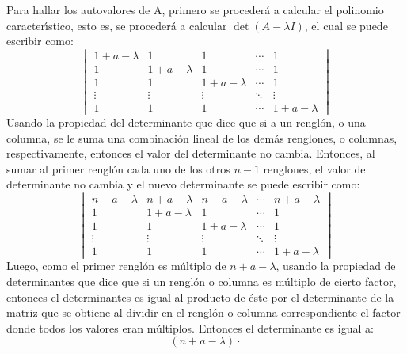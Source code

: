 \begin{solucion}
 Para hallar los autovalores de A, primero se proceder\'a a calcular el polinomio caracter\'{\i}stico, esto es, se proceder\'a a calcular $\det (A - \lambda I)$, el cual se puede escribir como:
 \begin{equation*}
  \begin{vmatrix}
   1+a-\lambda & 1               &    1           & \cdots & 1 \\ 
   1           & 1 + a - \lambda &    1           & \cdots & 1 \\
   1           & 1               & 1 + a - \lambda & \cdots & 1 \\
   \vdots & \vdots & \vdots & \ddots & \vdots \\
   1           & 1               &    1           & \cdots & 1 + a - \lambda 
  \end{vmatrix}
 \end{equation*}
 Usando la propiedad del determinante que dice que si a un rengl\'on, o una columna, se le suma una combinaci\'on lineal de los dem\'as renglones, o columnas, respectivamente, entonces el valor del determinante no cambia. Entonces, al sumar al primer rengl\'on cada uno de los otros $n-1$ renglones, el valor del determinante no cambia y el nuevo determinante se puede escribir como:
 \begin{equation*}
  \begin{vmatrix}
   n + a - \lambda & n + a - \lambda & n + a - \lambda & \cdots & n + a - \lambda \\ 
   1               & 1 + a - \lambda & 1               & \cdots & 1 \\
   1               & 1               & 1 + a - \lambda & \cdots & 1 \\
   \vdots & \vdots & \vdots & \ddots & \vdots \\
   1               & 1               & 1               & \cdots & 1 + a - \lambda
  \end{vmatrix}
 \end{equation*}
 Luego, como el primer rengl\'on es m\'ultiplo de $n + a - \lambda$, usando la propiedad de determinantes que dice que si un rengl\'on o columna es m\'ultiplo de cierto factor, entonces el determinantes es igual al producto de \'este por el determinante de la matriz que se obtiene al dividir en el rengl\'on o columna correspondiente el factor donde todos los valores eran m\'ultiplos. Entonces el determinante es igual a:
 \begin{equation*}
  (n+a-\lambda)\cdot 

\end{equation*}
\end{solucion}
